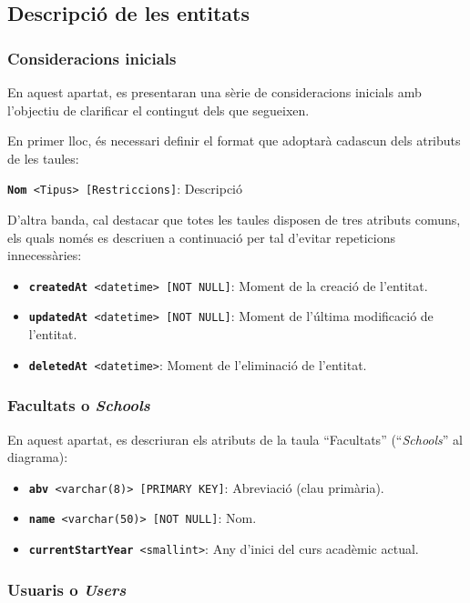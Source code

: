 \documentclass[a4paper,12pt]{ThesisStyle}
\begin{document}
\subsection{Descripció de les entitats}
\label{subsec:bd_entitats}

\subsubsection{Consideracions inicials}

En aquest apartat, es presentaran una sèrie de consideracions inicials amb l'objectiu de clarificar el contingut dels que segueixen.

En primer lloc, és necessari definir el format que adoptarà cadascun dels atributs de les taules:
\\[8pt]
\centerline{\texttt{\textbf{Nom} <Tipus> [Restriccions]}: Descripció}

D'altra banda, cal destacar que totes les taules disposen de tres atributs comuns, els quals només es descriuen a continuació per tal d'evitar repeticions innecessàries:
\begin{itemize}
  \item \texttt{\textbf{createdAt} <datetime> [NOT NULL]}: Moment de la creació de l'entitat.
  \item \texttt{\textbf{updatedAt} <datetime> [NOT NULL]}: Moment de l'última modificació de l'entitat.
  \item \texttt{\textbf{deletedAt} <datetime>}: Moment de l'eliminació de l'entitat.
\end{itemize}

\subsubsection{Facultats o \textit{Schools}}

En aquest apartat, es descriuran els atributs de la taula ``Facultats'' (``\textit{Schools}'' al diagrama):
\begin{itemize}
  \item \texttt{\textbf{abv} <varchar(8)> [PRIMARY KEY]}: Abreviació (clau primària).
  \item \texttt{\textbf{name} <varchar(50)> [NOT NULL]}: Nom.
  \item \texttt{\textbf{currentStartYear} <smallint>}: Any d'inici del curs acadèmic actual.
\end{itemize}

\subsubsection{Usuaris o \textit{Users}}
\end{document}
